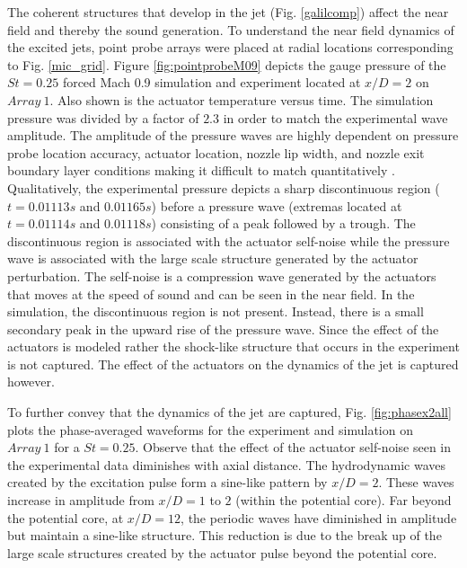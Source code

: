 \documentclass[english]{aiaa-tc}
\begin{document}
The coherent structures that develop in the jet (Fig. \ref{galilcomp}) affect the near field and thereby the sound generation.
To understand the near field dynamics of the excited jets, point probe arrays were placed at radial locations corresponding to Fig. \ref{mic_grid}.
Figure \ref{fig:pointprobeM09} depicts the gauge pressure of the $St=0.25$ forced Mach 0.9 simulation and experiment located at $x/D=2$ on $Array~1$. Also shown is the actuator temperature versus time. The simulation pressure was divided by a factor of $2.3$ in order to match the experimental wave amplitude. The amplitude of the pressure waves are highly dependent on pressure probe location accuracy, actuator location, nozzle lip width, and nozzle exit boundary layer conditions making it difficult to match quantitatively \cite{sinha2013}. Qualitatively, the experimental pressure depicts a sharp discontinuous region ($t=0.01113s$ and $0.01165s$)  before a pressure wave (extremas located at $t=0.01114s$ and $0.01118s$) consisting of a peak followed by a trough. The discontinuous region is associated with the actuator self-noise while the pressure wave is associated with the large scale structure generated by the actuator perturbation. The self-noise is a compression wave generated by the actuators that moves at the speed of sound and can be seen in the near field. In the simulation, the discontinuous region is not present. Instead, there is a small secondary peak in the upward rise of the pressure wave. Since the effect of the actuators is modeled rather the shock-like structure that occurs in the experiment is not captured. The effect of the actuators on the dynamics of the jet is captured however.

To further convey that the dynamics of the jet are captured, Fig. \ref{fig:phasex2all} plots the phase-averaged waveforms for the experiment and simulation on $Array~1$ for a $St=0.25$. Observe that the effect of the actuator self-noise seen in the experimental data diminishes with axial distance. The hydrodynamic waves created by the excitation pulse form a sine-like pattern by $x/D=2$. These waves increase in amplitude from $x/D=1$ to $2$ (within the potential core). Far beyond the potential core, at $x/D=12$, the periodic waves have diminished in amplitude but maintain a sine-like structure. This reduction is due to the break up of the large scale structures created by the actuator pulse beyond the potential core.
\end{document}
